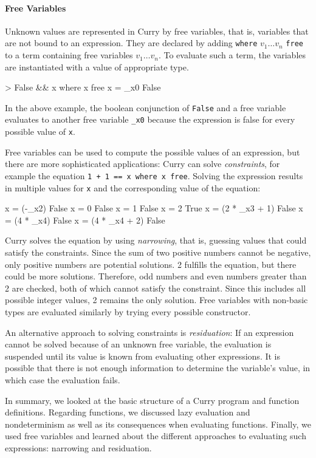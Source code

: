 \documentclass[paper = a4, fleqn, twoside]{scrreprt}
\begin{document}
\paragraph{Free Variables}
Unknown values are represented in Curry by free variables, that is, variables that are not bound to an expression. They are declared by adding \texttt{where} $v_1\dots v_n$ \texttt{free} to a term containing free variables $v_1 \dots v_n$. To evaluate such a term, the variables are instantiated with a value of appropriate type.
\begin{haskellcode}
> False && x where x free
{x = _x0} False
\end{haskellcode}
In the above example, the boolean conjunction of \texttt{False} and a free variable evaluates to another free variable \texttt{\_x0} because the expression is false for every possible value of \texttt{x}.
\par
Free variables can be used to compute the possible values of an expression, but there are more sophisticated applications: Curry can solve \textit{constraints}, for example the equation \texttt{1 + 1 == x where x free}. Solving the expression results in multiple values for \texttt{x} and the corresponding value of the equation:
\begin{haskellcode}
{x = (-_x2)} False
{x = 0} False
{x = 1} False
{x = 2} True
{x = (2 * _x3 + 1)} False
{x = (4 * _x4)} False
{x = (4 * _x4 + 2)} False
\end{haskellcode}
\label{narrowing}
Curry solves the equation by using \textit{narrowing}, that is, guessing values that could satisfy the constraints\citep{Hanus13}. Since the sum of two positive numbers cannot be negative, only positive numbers are potential solutions. 2 fulfills the equation, but there could be more solutions. Therefore, odd numbers and even numbers greater than 2 are checked, both of which cannot satisfy the constraint. Since this includes all possible integer values, 2 remains the only solution. Free variables with non-basic types are evaluated similarly by trying every possible constructor.
\par 
An alternative approach to solving constraints is \textit{residuation}: If an expression cannot be solved because of an unknown free variable, the evaluation is suspended until its value is known from evaluating other expressions. It is possible that there is not enough information to determine the variable's value, in which case the evaluation fails. \\
\par \noindent
In summary, we looked at the basic structure of a Curry program and function definitions. Regarding functions, we discussed lazy evaluation and nondeterminism as well as its consequences when evaluating functions. Finally, we used free variables and learned about the different approaches to evaluating such expressions: narrowing and residuation.
\end{document}
